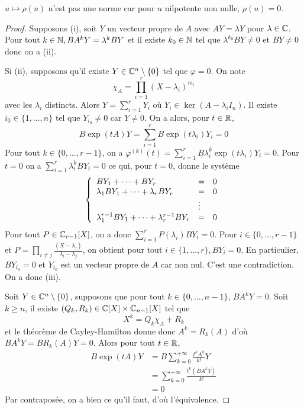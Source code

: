 \documentclass[12pt]{article}
\begin{document}
\begin{remark}
	$u\mapsto\rho(u)$ n'est pas une norme car pour $u$ nilpotente non nulle, $\rho(u)=0$.
\end{remark}

\begin{proof}
	Supposons (i), soit $Y$ un vecteur propre de $A$ avec $AY=\lambda Y$ pour $\lambda\in\mathbb{C}$. Pour tout $k\in\mathbb{N},BA^{k}Y=\lambda^{k}BY$ et il existe $k_{0}\in\mathbb{N}$ tel que $\lambda^{k_{0}}BY\neq0$ et $BY\neq0$ donc on a (ii).

	Si (ii), supposons qu'il existe $Y\in\mathbb{C}^{n}\setminus\{0\}$ tel que $\varphi=0$. On note 
	\begin{equation}\chi_{A}=\prod_{i=1}^{r}(X-\lambda_{i})^{m_{i}}\end{equation} avec les $\lambda_{i}$ distincts. Alors $Y=\sum_{i=1}^{r}Y_{i}$ où $Y_{i}\in\ker(A-\lambda_{i}I_{n})$. Il existe $i_{0}\in\{1,\dots,n\}$ tel que $Y_{i_{0}}\neq0$ car $Y\neq0$. On a alors, pour $t\in\mathbb{R}$,
	\begin{equation}B\exp(tA)Y=\sum_{i=1}^{r}B\exp(t\lambda_{i})Y_{i}=0\end{equation}
	Pour tout $k\in\{0,\dots,r-1\}$, on a $\varphi^{(k)}(t)=\sum_{i=1}^{r}B\lambda_{i}^{k}\exp(t\lambda_{i})Y_{i}=0$. Pour $t=0$ on a $\sum_{i=1}^{r}\lambda_{i}^{k}BY_{i}=0$ ce qui, pour $t=0$, donne le système 
	\begin{equation}
	\left\{
		\begin{array}[]{lll}
			BY_{1}+\dots+BY_{r} &= &0\\
			\lambda_{1}BY_{1}+\dots+\lambda_{r}BY_{r} &=& 0\\
			&\vdots&\\
			\lambda_{1}^{r-1}BY_{1}+\dots+\lambda_{r}^{r-1}BY_{r} &= &0
		\end{array}
	\right.
	\end{equation}
	Pour tout $P\in\mathbb{C}_{r-1}[X]$, on a donc $\sum_{i=1}^{r}P(\lambda_{i})BY_{i}=0$. Pour $i\in\{0,\dots,r-1\}$ et $P=\prod_{i\neq j}\frac{(X-\lambda_{j})}{\lambda_{i}-\lambda_{j}}$, on obtient pour tout $i\in\{1,\dots, r\}, BY_{i}=0$. En particulier, $BY_{i_{0}}=0$ et $Y_{i_{0}}$ est un vecteur propre de $A$ car non nul. C'est une contradiction. On a donc (iii).

	\item Soit $Y\in\mathbb{C}^{n}\setminus\{0\}$, supposons que pour tout $k\in\{0,\dots,n-1\}$, $BA^{k}Y=0$. Soit $k\geqslant n$, il existe $(Q_{k},R_{k})\in\mathbb{C}[X]\times\mathbb{C}_{n-1}[X]$ tel que 
	\begin{equation}X^{k}=Q_{k}\chi_{A}+R_{k}\end{equation}
	et le théorème de Cayley-Hamilton donne donc $A^{k}=R_{k}(A)$ d'où $BA^{k}Y=BR_{k}(A)Y=0$. Alors pour tout $t\in\mathbb{R}$,
	\begin{align}
		B\exp(tA)Y
		&=B\sum_{k=0}^{+\infty}\frac{t^{k}A^{k}}{k!}Y\\
		&=\sum_{k=0}^{+\infty}\frac{t^{k}(BA^{k}Y)}{k!}\\
		&=0
	\end{align}
	Par contraposée, on a bien ce qu'il faut, d'où l'équivalence.
\end{proof}
\end{document}
